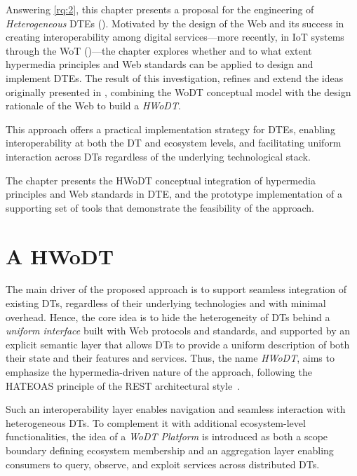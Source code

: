 Answering \ref{rq:2}, this chapter presents a proposal for the engineering of \emph{Heterogeneous} \acp{DTE} ().
%
Motivated by the design of the Web and its success in creating interoperability among digital services---more recently, in \ac{IoT} systems through the \ac{WoT} ()---the chapter explores whether and to what extent hypermedia principles and Web standards can be applied to design and implement \acp{DTE}. 
%
The result of this investigation, refines and extend the ideas originally presented in \cite{web-of-dt-ricci-2022}, combining the \ac{WoDT} conceptual model with the design rationale of the Web to build a \emph{\ac{HWoDT}}.

This approach offers a practical implementation strategy for \acp{DTE}, enabling interoperability at both the \ac{DT} and ecosystem levels, and facilitating uniform interaction across \acp{DT} regardless of the underlying technological stack.

The chapter presents the \ac{HWoDT} conceptual integration of hypermedia principles and Web standards in \ac{DTE}, 
and the prototype implementation of a supporting set of tools that demonstrate the feasibility of the approach.


\section{A \acl{HWoDT}}
\label{sec:hwodt-idea}

The main driver of the proposed approach is to support seamless integration of existing \acp{DT}, regardless of their underlying technologies and with minimal overhead.
%
Hence, the core idea is to hide the heterogeneity of \acp{DT} behind a \emph{uniform interface} built with Web protocols and standards, and supported by an explicit semantic layer that allows \acp{DT} to provide a uniform description of both their state and their features and services. 
%
Thus, the name \emph{\acf{HWoDT}}, aims to emphasize the hypermedia-driven nature of the approach, following the \ac{HATEOAS} principle of the \ac{REST} architectural style~\cite{fielding2000architectural}.

Such an interoperability layer enables navigation and seamless interaction with heterogeneous \acp{DT}.
%
To complement it with additional ecosystem-level functionalities, the idea of a \emph{WoDT Platform} is introduced as both a scope boundary defining ecosystem membership and an aggregation layer enabling consumers to query, observe, and exploit services across distributed \acp{DT}.

